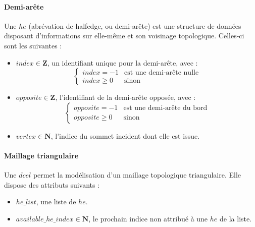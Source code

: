 \documentclass[]{article}
\begin{document}
\paragraph{Demi-arête}
Une $he$ (abrévation de halfedge, ou demi-arête) est une structure de données disposant d'informations sur elle-même et son voisinage topologique. Celles-ci sont les suivantes :
\begin{itemize}
	\item $index \in \mathbf{Z}$, un identifiant unique pour la demi-arête, avec :
	      \[
		      \left\{
		      \begin{array}{ll}
			      index = -1   & \mbox{est une demi-arête nulle} \\
			      index \geq 0 & \mbox{sinon}
		      \end{array}
		      \right.
	      \]
	\item $opposite \in \mathbf{Z}$, l'identifiant de la demi-arête opposée, avec :
	      \[
		      \left\{
		      \begin{array}{ll}
			      opposite = -1   & \text{est une demi-arête du bord} \\
			      opposite \geq 0 & \text{sinon}
		      \end{array}
		      \right.
	      \]
	\item $vertex \in \mathbf{N}$, l'indice du sommet incident dont elle est issue.
\end{itemize}

\paragraph{Maillage triangulaire}
Une $dcel$ permet la modélisation d'un maillage topologique triangulaire. Elle dispose des attributs suivants :
\begin{itemize}
	\item $he\_list$, une liste de $he$.
	\item $available\_he\_index \in \mathbf{N}$, le prochain indice non attribué à une $he$ de la liste.
\end{itemize}
\end{document}
